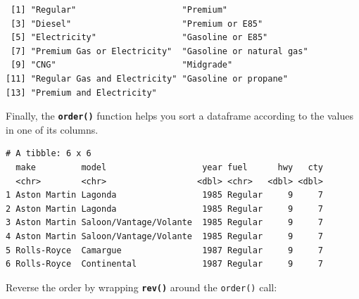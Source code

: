\documentclass[
]{book}
\newenvironment{Shaded}{\begin{snugshade}}{\end{snugshade}}
\newcommand{\CommentTok}[1]{\textcolor[rgb]{0.56,0.35,0.01}{\textit{#1}}}
\newcommand{\DecValTok}[1]{\textcolor[rgb]{0.00,0.00,0.81}{#1}}
\newcommand{\KeywordTok}[1]{\textcolor[rgb]{0.13,0.29,0.53}{\textbf{#1}}}
\newcommand{\NormalTok}[1]{#1}
\newcommand{\OperatorTok}[1]{\textcolor[rgb]{0.81,0.36,0.00}{\textbf{#1}}}
\newcommand{\StringTok}[1]{\textcolor[rgb]{0.31,0.60,0.02}{#1}}
\begin{document}
\begin{Shaded}
\end{Shaded}

\begin{verbatim}
 [1] "Regular"                     "Premium"                    
 [3] "Diesel"                      "Premium or E85"             
 [5] "Electricity"                 "Gasoline or E85"            
 [7] "Premium Gas or Electricity"  "Gasoline or natural gas"    
 [9] "CNG"                         "Midgrade"                   
[11] "Regular Gas and Electricity" "Gasoline or propane"        
[13] "Premium and Electricity"    
\end{verbatim}

Finally, the \textbf{\texttt{order()}} function helps you sort a dataframe according to the values in one of its columns.

\begin{Shaded}
\end{Shaded}

\begin{verbatim}
# A tibble: 6 x 6
  make         model                   year fuel      hwy   cty
  <chr>        <chr>                  <dbl> <chr>   <dbl> <dbl>
1 Aston Martin Lagonda                 1985 Regular     9     7
2 Aston Martin Lagonda                 1985 Regular     9     7
3 Aston Martin Saloon/Vantage/Volante  1985 Regular     9     7
4 Aston Martin Saloon/Vantage/Volante  1985 Regular     9     7
5 Rolls-Royce  Camargue                1987 Regular     9     7
6 Rolls-Royce  Continental             1987 Regular     9     7
\end{verbatim}

Reverse the order by wrapping \textbf{\texttt{rev()}} around the \texttt{order()} call:
\end{document}
